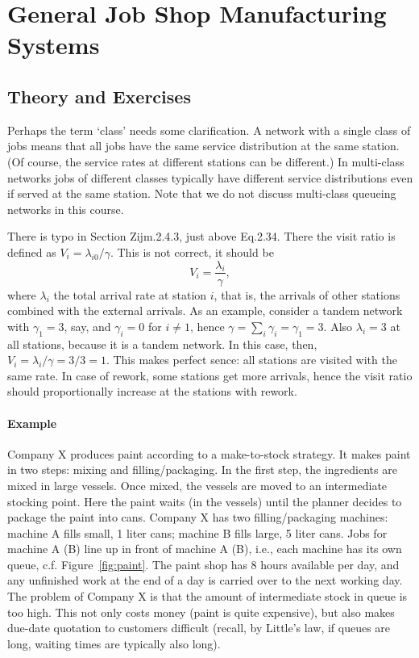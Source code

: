 

\section{General Job Shop Manufacturing Systems}
\label{sec:general-job-shop}

\subsection*{Theory and Exercises}
\label{sec:exercises}


Perhaps the term `class' needs some clarification. A network with a
single class of jobs means that all jobs have the same service
distribution at the same station. (Of course, the service rates at
different stations can be different.) In multi-class networks jobs of
different classes typically have different service distributions even
if served at the same station. Note that we do not discuss multi-class
queueing networks in this course.

There is typo in Section Zijm.2.4.3, just above Eq.2.34. There the visit ratio is defined as $V_i=\lambda_{i0}/\gamma$. This is not correct, it should be
\begin{equation*}
  V_i = \frac{\lambda_i}{\gamma},
\end{equation*}
where $\lambda_i$ the total arrival rate at station $i$, that is, the
arrivals of other stations combined with the external arrivals. As an
example, consider a tandem network with $\gamma_{1} = 3$, say, and
$\gamma_i=0$ for $i\neq 1$, hence
$\gamma=\sum_i \gamma_i = \gamma_1 = 3$. Also $\lambda_i = 3$ at all
stations, because it is a tandem network. In this case, then,
$V_i = \lambda_i/\gamma = 3/3 = 1$. This makes perfect sence: all
stations are visited with the same rate.  In case of rework, some
stations get more arrivals, hence the visit ratio should
proportionally increase at the stations with rework.

\paragraph{Example}

Company X produces paint according to a make-to-stock strategy. It
makes paint in two steps: mixing and filling/packaging. In the first
step, the ingredients are mixed in large vessels. Once mixed, the
vessels are moved to an intermediate stocking point. Here the paint
waits (in the vessels) until the planner decides to package the paint
into cans. Company X has two filling/packaging machines: machine A
fills small, 1 liter cans; machine B fills large, 5 liter cans. Jobs
for machine A (B) line up in front of machine A (B), i.e., each
machine has its own queue, c.f. Figure~\ref{fig:paint}. The paint shop
has 8 hours available per day, and any unfinished work at the end of a
day is carried over to the next working day. The problem of Company X
is that the amount of intermediate stock in queue is too high. This
not only costs money (paint is quite expensive), but also makes
due-date quotation to customers difficult (recall, by Little's law, if
queues are long, waiting times are typically also long).


